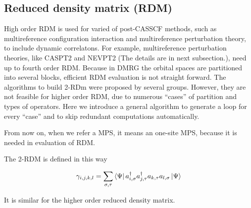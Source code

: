 \subsection{Reduced density matrix (RDM)}

High order RDM is used for varied of post-CASSCF methods, such as multireference configuration interaction\cite{buenker_individualized_1974} and multireference perturbation theory\cite{andersson_second-order_1990, angeli_n-electron_2002}, to include dynamic correlatons. For example, multireference perturbation theories, like CASPT2\cite{andersson_second-order_1990} and NEVPT2\cite{angeli_n-electron_2002} (The details are in next subsection.), need up to fourth order RDM. 
Because in DMRG the orbital spaces are partitioned into several blocks, efficient RDM evaluation is not straight forward. The algorithms to build 2-RDm were proposed by several groups.\cite{ghosh_orbital_2008,zgid_obtaining_2008} However, they are not feasible for higher order RDM, due to numerous ``cases'' of partition and types of operators. Here we introduce a general algorithm to generate a loop for every ``case'' and to skip redundant computations automatically.

From now on, when we refer a MPS, it means an one-site MPS, because it is needed in evaluation of RDM.

The 2-RDM is defined in this way

\begin{equation}
\gamma_{i,j,k,l}=\sum_{\sigma,\tau} \bra{\Psi}a^\dagger_{i,\sigma}a^\dagger_{j,\tau}a_{k,\tau}a_{l,\sigma}\ket{\Psi}
\end{equation}

It is similar for the higher order reduced density matrix.

%
%


